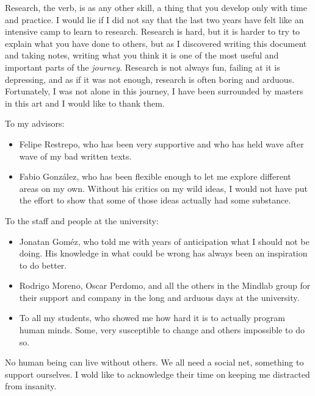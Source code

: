 \begin{acknowledgements}
\addchaptertocentry{\acknowledgementname} %

Research, the verb, is as any other skill, a thing that you develop only with time and
practice. I would lie if I did not say that the last two years have felt like an intensive
camp to learn to research. Research is hard, but it is harder to try to explain what you
have done to others, but as I discovered writing this document and taking notes, writing
what you think it is one of the most useful and important parts of the \textit{journey}.
Research is not always fun, failing at it is depressing, and as if it was not enough,
research is often boring and arduous. Fortunately, I was not alone in this journey, I have
been surrounded by masters in this art and I would like to thank them.

To my advisors:

\begin{itemize}
\tightlist
\item Felipe Restrepo, who has been very supportive and who has held wave after wave of my
  bad written texts.
\item Fabio González, who has been flexible enough to let me explore different areas on my
  own. Without his critics on my wild ideas, I would not have put the effort to show that
  some of those ideas actually had some substance.
\end{itemize}

To the staff and people at the university:

\begin{itemize}
\tightlist
\item Jonatan Goméz, who told me with years of anticipation what I should not be doing.
  His knowledge in what could be wrong has always been an inspiration to do better.
\item Rodrigo Moreno, Oscar Perdomo, and all the others in the Mindlab group for their
  support and company in the long and arduous days at the university.
\item To all my students, who showed me how hard it is to actually program human minds.
  Some, very susceptible to change and others impossible to do so.
\end{itemize}

No human being can live without others. We all need a social net, something to support
ourselves. I wold like to acknowledge their time on keeping me distracted from insanity.


\end{acknowledgements}
